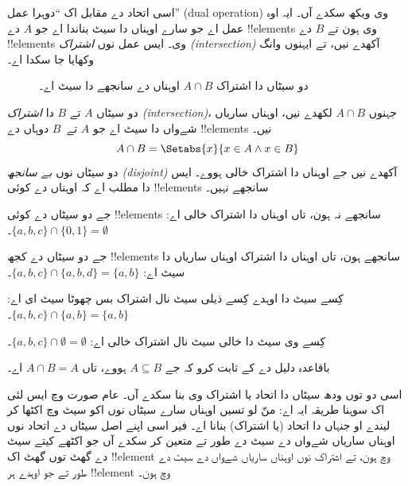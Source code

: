 \documentclass[../../../include/open-logic-section]{subfiles}
\begin{document}
\begin{explain}
اسی اتحاد دے مقابل اک ``دوہرا عمل'' (dual operation) وی ویکھ سکدے آں۔ ایہ اوہ عمل
اے جو سارے اوہناں  دا سیٹ بناندا اے جو
$A$ دے !!{element}s وی ہون تے $B$ دے !!{element}s وی۔ ایس عمل نوں
\emph{اشتراک (intersection)} آکھدے نیں، تے ایہنوں  وانگ وکھایا
جا سکدا اے۔
\begin{figure}
  \caption{دو سیٹاں دا اشتراک $A \cap B$ اوہناں دے سانجھے
     دا سیٹ اے۔}
\end{figure}
\end{explain}

\begin{defn}
دو سیٹاں $A$ تے $B$ دا \emph{اشتراک (intersection)}، جہنوں $A \cap B$ لکھدے نیں،
اوہناں ساریاں شےواں دا سیٹ اے جو $A$ تے~$B$ دوہاں دے !!{element}s نیں۔
\[
A \cap B = \Setabs{x}{x \in A \land x \in B}
\]
دو سیٹاں نوں \emph{بے سانجھ (disjoint)} آکھدے نیں جے اوہناں دا اشتراک خالی ہووے۔
ایس دا مطلب اے کہ اوہناں دے کوئی !!{element}s سانجھے نہیں۔
\end{defn}

\begin{ex}
جے دو سیٹاں دے کوئی !!{element}s سانجھے نہ ہون، تاں اوہناں دا اشتراک
خالی اے: $\{ a, b, c\} \cap \{ 0, 1\} = \emptyset$۔

جے دو سیٹاں دے کجھ !!{element}s سانجھے ہون، تاں اوہناں دا اشتراک اوہناں
ساریاں دا سیٹ اے: $\{a, b, c \} \cap \{a, b, d \} = \{a, b\}$۔

کِسے سیٹ دا اوہدے کِسے ذیلی سیٹ نال اشتراک بس چھوٹا سیٹ ای اے:
$\{a, b, c\} \cap \{a, b\} = \{a, b\}$۔

کِسے وی سیٹ دا خالی سیٹ نال اشتراک خالی اے:
$\{a, b, c \} \cap \emptyset = \emptyset$۔
\end{ex}

\begin{prob}
باقاعدہ دلیل دے کے ثابت کرو کہ جے $A \subseteq B$ ہووے، تاں
$A \cap B = A$ اے۔
\end{prob}

\begin{explain}
اسی دو توں ودھ سیٹاں دا اتحاد یا اشتراک وی بنا سکدے آں۔ عام صورت وچ ایس
لئی اک سوہنا طریقہ ایہ اے: منّ لو تسیں اوہناں سارے سیٹاں نوں اکو سیٹ
وچ اکٹھا کر لیندے او جنہاں دا اتحاد (یا اشتراک) بنانا اے۔ فیر اسی اپنے
اصل سیٹاں دے اتحاد نوں اوہناں ساریاں شےواں دے سیٹ دے طور تے متعین کر
سکدے آں جو اکٹھے کیتے سیٹ دے گھٹ توں گھٹ اک !!{element} وچ ہون، تے
اشتراک نوں اوہناں ساریاں شےواں دے سیٹ دے طور تے جو اوہدے ہر !!{element}
وچ ہون۔
\end{explain}
\end{document}
